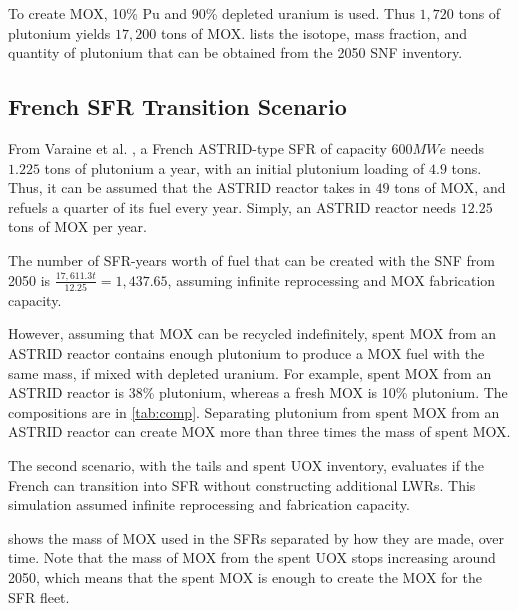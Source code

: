 To create \gls{MOX}, 10\% Pu and 90\% depleted uranium is used.
Thus $1,720$ tons of plutonium yields $17,200$ tons of
\gls{MOX}.  lists the isotope, mass fraction,
and quantity of plutonium that can be obtained from the 2050 \gls{SNF} inventory.


\subsection{French \gls{SFR} Transition Scenario}

From Varaine et al. \cite{marsaultmarie-sophie_pre-conceptual_2012}, a French
ASTRID-type \gls{SFR} of capacity $600 MWe$ needs $1.225$ tons of
plutonium a year, with an initial plutonium loading of $4.9$ tons.
Thus, it can be assumed that the ASTRID reactor takes in $49$ tons of 
\gls{MOX}, and refuels a quarter of its fuel every year. Simply,
an ASTRID reactor needs $12.25$ tons of \gls{MOX} per year. 

The number of SFR-years worth of fuel that can be created with
the \gls{SNF} from 2050 is $\frac{17,611.3 t}{12.25} = 1,437.65 $,
assuming infinite reprocessing and \gls{MOX} fabrication capacity.

However, assuming that \gls{MOX} can be recycled indefinitely,
spent \gls{MOX} from an ASTRID reactor
contains enough plutonium to produce a \gls{MOX} fuel with
the same mass, if mixed with depleted uranium. For example,
spent \gls{MOX} from an ASTRID reactor is 38\% plutonium,
whereas a fresh \gls{MOX} is 10\% plutonium.
The compositions are in \cref{tab:comp}.
Separating plutonium from spent \gls{MOX} from
an ASTRID reactor can create \gls{MOX} more than
three times the mass of spent \gls{MOX}.

The second scenario, with the tails and spent \gls{UOX}
inventory, evaluates if the French can transition into \gls{SFR}
without constructing additional \gls{LWR}s. This simulation
assumed infinite reprocessing and fabrication capacity.

 shows the mass of \gls{MOX} used in the 
\gls{SFR}s separated by how they are made, over time.
Note that the mass of \gls{MOX} from the spent \gls{UOX}
stops increasing around 2050, which means that the spent
\gls{MOX} is enough to create the \gls{MOX} for the
\gls{SFR} fleet. 

